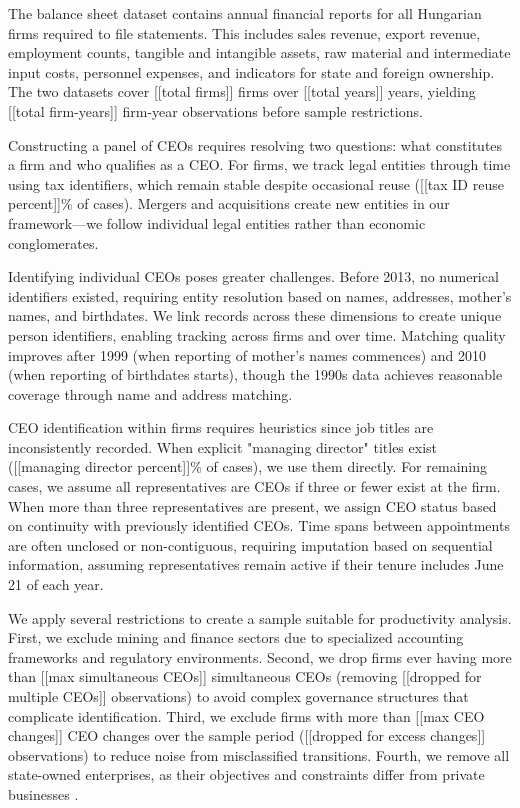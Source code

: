 \documentclass[11pt,a4paper]{article}
\begin{document}
The balance sheet dataset contains annual financial reports for all Hungarian firms required to file statements. This includes sales revenue, export revenue, employment counts, tangible and intangible assets, raw material and intermediate input costs, personnel expenses, and indicators for state and foreign ownership. The two datasets cover [[total firms]] firms over [[total years]] years, yielding [[total firm-years]] firm-year observations before sample restrictions.

Constructing a panel of CEOs requires resolving two questions: what constitutes a firm and who qualifies as a CEO. For firms, we track legal entities through time using tax identifiers, which remain stable despite occasional reuse ([[tax ID reuse percent]]\% of cases). Mergers and acquisitions create new entities in our framework—we follow individual legal entities rather than economic conglomerates.

Identifying individual CEOs poses greater challenges. Before 2013, no numerical identifiers existed, requiring entity resolution based on names, addresses, mother's names, and birthdates. We link records across these dimensions to create unique person identifiers, enabling tracking across firms and over time. Matching quality improves after 1999 (when reporting of mother's names commences) and 2010 (when reporting of birthdates starts), though the 1990s data achieves reasonable coverage through name and address matching. 

CEO identification within firms requires heuristics since job titles are inconsistently recorded. When explicit "managing director" titles exist ([[managing director percent]]\% of cases), we use them directly. For remaining cases, we assume all representatives are CEOs if three or fewer exist at the firm. When more than three representatives are present, we assign CEO status based on continuity with previously identified CEOs. Time spans between appointments are often unclosed or non-contiguous, requiring imputation based on sequential information, assuming representatives remain active if their tenure includes June 21 of each year.

We apply several restrictions to create a sample suitable for productivity analysis. First, we exclude mining and finance sectors due to specialized accounting frameworks and regulatory environments. Second, we drop firms ever having more than [[max simultaneous CEOs]] simultaneous CEOs (removing [[dropped for multiple CEOs]] observations) to avoid complex governance structures that complicate identification. Third, we exclude firms with more than [[max CEO changes]] CEO changes over the sample period ([[dropped for excess changes]] observations) to reduce noise from misclassified transitions. Fourth, we remove all state-owned enterprises, as their objectives and constraints differ from private businesses \citep{orban2019inception}.
\end{document}
